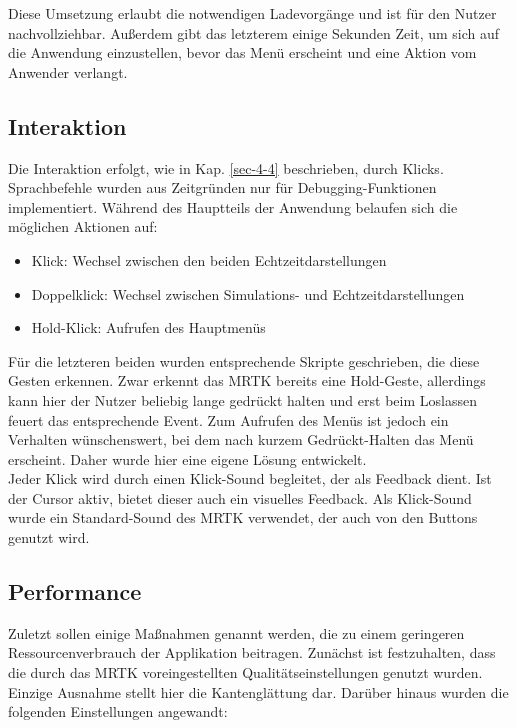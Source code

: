 Diese Umsetzung erlaubt die notwendigen Ladevorgänge und ist für den Nutzer nachvollziehbar. Außerdem gibt das letzterem einige Sekunden Zeit, um sich auf die Anwendung einzustellen, bevor das Menü erscheint und eine Aktion vom Anwender verlangt.


\subsection{Interaktion}
Die Interaktion erfolgt, wie in Kap. \ref{sec-4-4} beschrieben, durch Klicks. Sprachbefehle wurden aus Zeitgründen nur für Debugging-Funktionen implementiert. 
Während des Hauptteils der Anwendung belaufen sich die möglichen Aktionen auf:

\begin{itemize}
	\setlength{\itemsep}{-1pt}
	\singlespacing
	\item Klick: Wechsel zwischen den beiden Echtzeitdarstellungen
	\item Doppelklick: Wechsel zwischen Simulations- und Echtzeitdarstellungen
	\item Hold-Klick: Aufrufen des Hauptmenüs
\end{itemize}

Für die letzteren beiden wurden entsprechende Skripte geschrieben, die diese Gesten erkennen. Zwar erkennt das MRTK bereits eine Hold-Geste, allerdings kann hier der Nutzer beliebig lange gedrückt halten und erst beim Loslassen feuert das entsprechende Event. Zum Aufrufen des Menüs ist jedoch ein Verhalten wünschenswert, bei dem nach kurzem Gedrückt-Halten das Menü erscheint. Daher wurde hier eine eigene Lösung entwickelt.\\

Jeder Klick wird durch einen Klick-Sound begleitet, der als Feedback dient. Ist der Cursor aktiv, bietet dieser auch ein visuelles Feedback. Als Klick-Sound wurde ein Standard-Sound des MRTK verwendet, der auch von den Buttons genutzt wird.

\subsection{Performance}
Zuletzt sollen einige Maßnahmen genannt werden, die zu einem geringeren Ressourcenverbrauch der Applikation beitragen. Zunächst ist festzuhalten, dass die durch das MRTK voreingestellten Qualitätseinstellungen genutzt wurden. Einzige Ausnahme stellt hier die Kantenglättung dar. Darüber hinaus wurden die folgenden Einstellungen angewandt:

